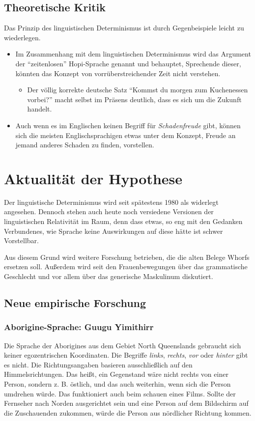 \documentclass[12pt]{scrreprt}
\begin{document}
		\subsection{Theoretische Kritik}
		\label{sec:sawo_theokritik}
		Das Prinzip des linguistischen Determinismus ist durch Gegenbeispiele leicht
		zu wiederlegen.
		\begin{itemize}
			\item Im Zusammenhang mit dem linguistischen Determinismus wird das
			Argument der \enquote{zeitenlosen} Hopi-Sprache genannt und behauptet,
			Sprechende dieser, könnten das Konzept von vorrüberstreichender Zeit nicht
			verstehen.
				\begin{itemize}
					\item Der völlig korrekte deutsche Satz \enquote{Kommst du morgen zum
					Kuchenessen vorbei?} macht selbst im Präsens deutlich, dass es sich um
					die Zukunft handelt.
				\end{itemize}
				\item Auch wenn es im Englischen keinen Begriff für \textit{Schadenfreude}
				gibt, können sich die meisten Englischsprachigen etwas unter dem Konzept,
				Freude an jemand anderes Schaden zu finden, vorstellen.\autocite{article:Linguistic_Relativity}
		\end{itemize}

	\section{Aktualität der Hypothese}
	\label{sec:sawo_aktualität}
	Der linguistische Determinismus wird seit spätestens 1980 als widerlegt
	angesehen.\autocite{article:Linguistic_Relativity2}
	Dennoch stehen auch heute noch versiedene Versionen der linguistischen
	Relativität im Raum, denn dass etwas, so eng mit den Gedanken Verbundenes, wie
	Sprache keine Auswirkungen auf diese hätte ist schwer Vorstellbar.

	Aus diesem Grund wird weitere Forschung betrieben, die die alten Belege Whorfs
	ersetzen soll. Außerdem wird seit den Frauenbewegungen über das grammatische
	Geschlecht und vor allem über das generische Maskulinum diskutiert.
		\subsection{Neue empirische Forschung}
		\label{sec:sawo_empforschung}
		\subsubsection{Aborigine-Sprache: Guugu Yimithirr}
		\label{sec:sawo_guuguyim}
		Die Sprache der Aborigines aus dem Gebiet North Queenslands gebraucht sich
		keiner egozentrischen Koordinaten. Die Begriffe \textit{links},
		\textit{rechts}, \textit{vor} oder \textit{hinter} gibt es nicht. Die
		Richtungsangaben basieren ausschließlich auf den Himmelsrichtungen. Das heißt,
		ein Gegenstand wäre nicht rechts von einer Person, sondern z. B. östlich, und das
		auch weiterhin, wenn sich die Person umdrehen würde. Das funktioniert auch
		beim schauen eines Films. Sollte der Fernseher nach Norden ausgerichtet
		sein und eine Person auf dem Bildschirm auf die Zuschauenden zukommen, würde
		die Person aus nördlicher Richtung kommen.
\end{document}
